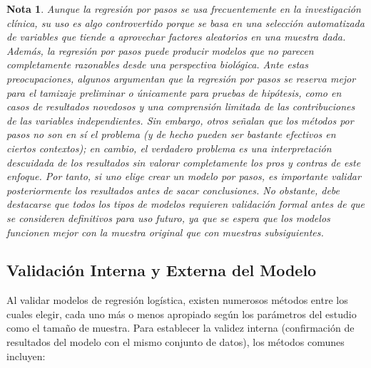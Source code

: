 \documentclass[12pt]{article}
\newtheorem{Note}{Nota}%
\begin{document}
\begin{Note}
Aunque la regresi\'on por pasos se usa frecuentemente en la investigaci\'on cl\'inica, su uso es algo controvertido porque se basa en una selecci\'on automatizada de variables que tiende a aprovechar factores aleatorios en una muestra dada.  Adem\'as, la regresi\'on por pasos puede producir modelos que no parecen completamente razonables desde una perspectiva biol\'ogica. Ante estas preocupaciones, algunos argumentan que la regresi\'on por pasos se reserva mejor para el tamizaje preliminar o \'unicamente para pruebas de hip\'otesis, como en casos de resultados novedosos y una comprensi\'on limitada de las contribuciones de las variables independientes. Sin embargo, otros se\~nalan que los m\'etodos por pasos no son en s\'i el problema (y de hecho pueden ser bastante efectivos en ciertos contextos); en cambio, el verdadero problema es una interpretaci\'on descuidada de los resultados sin valorar completamente los pros y contras de este enfoque. Por tanto, si uno elige crear un modelo por pasos, es importante validar posteriormente los resultados antes de sacar conclusiones. No obstante, debe destacarse que todos los tipos de modelos requieren validaci\'on formal antes de que se consideren definitivos para uso futuro, ya que se espera que los modelos funcionen mejor con la muestra original que con muestras subsiguientes.\cite{darlington1990, tabachnick2007, hosmer2000}
\end{Note}

\subsection{Validaci\'on Interna y Externa del Modelo}

Al validar modelos de regresi\'on log\'istica, existen numerosos m\'etodos entre los cuales elegir, cada uno m\'as o menos apropiado seg\'un los par\'ametros del estudio como el tama\~no de muestra. Para establecer la validez interna (confirmaci\'on de resultados del modelo con el mismo conjunto de datos), los m\'etodos comunes incluyen: 
\end{document}
